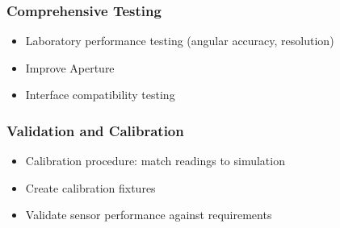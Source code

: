 \subsubsection*{Comprehensive Testing}
\begin{itemize}
  \item Laboratory performance testing (angular accuracy, resolution)
  \item Improve Aperture
  \item Interface compatibility testing
\end{itemize}

\subsubsection*{Validation and Calibration}
\begin{itemize}
  \item Calibration procedure: match readings to simulation
  \item Create calibration fixtures
  \item Validate sensor performance against requirements
\end{itemize}






